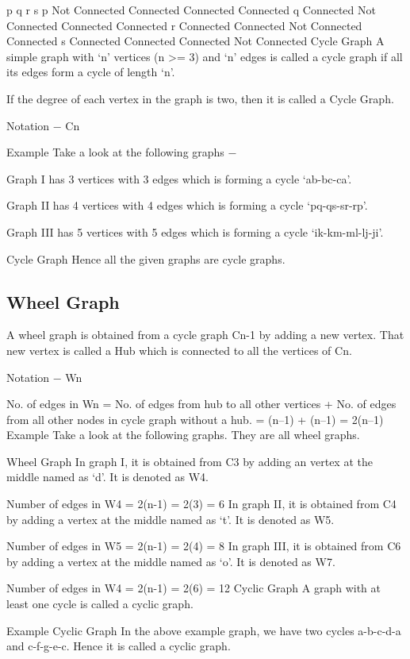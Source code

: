 p	q	r	s
p	Not Connected	Connected	Connected	Connected
q	Connected	Not Connected	Connected	Connected
r	Connected	Connected	Not Connected	Connected
s	Connected	Connected	Connected	Not Connected
Cycle Graph
A simple graph with ‘n’ vertices (n >= 3) and ‘n’ edges is called a cycle graph if all its edges form a cycle of length ‘n’.

If the degree of each vertex in the graph is two, then it is called a Cycle Graph.

Notation − Cn

Example
Take a look at the following graphs −

Graph I has 3 vertices with 3 edges which is forming a cycle ‘ab-bc-ca’.

Graph II has 4 vertices with 4 edges which is forming a cycle ‘pq-qs-sr-rp’.

Graph III has 5 vertices with 5 edges which is forming a cycle ‘ik-km-ml-lj-ji’.

Cycle Graph
Hence all the given graphs are cycle graphs.

\subsection{Wheel Graph}
A wheel graph is obtained from a cycle graph Cn-1 by adding a new vertex. That new vertex is called a Hub which is connected to all the vertices of Cn.

Notation − Wn

No. of edges in Wn = No. of edges from hub to all other vertices +
                     No. of edges from all other nodes in cycle graph without a hub.
                     = (n–1) + (n–1)
                     = 2(n–1)
Example
Take a look at the following graphs. They are all wheel graphs.

Wheel Graph
In graph I, it is obtained from C3 by adding an vertex at the middle named as ‘d’. It is denoted as W4.

Number of edges in W4 = 2(n-1) = 2(3) = 6
In graph II, it is obtained from C4 by adding a vertex at the middle named as ‘t’. It is denoted as W5.

Number of edges in W5 = 2(n-1) = 2(4) = 8
In graph III, it is obtained from C6 by adding a vertex at the middle named as ‘o’. It is denoted as W7.

Number of edges in W4 = 2(n-1) = 2(6) = 12
Cyclic Graph
A graph with at least one cycle is called a cyclic graph.

Example
Cyclic Graph
In the above example graph, we have two cycles a-b-c-d-a and c-f-g-e-c. Hence it is called a cyclic graph.

